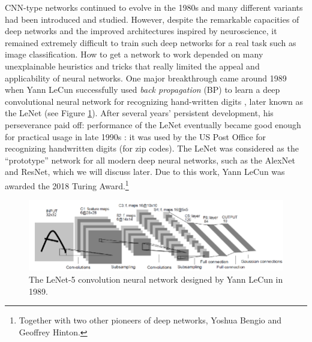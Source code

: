 \documentclass[../../book-main.tex]{subfiles}
\begin{document}
CNN-type networks continued to evolve in the 1980s and many different variants had been introduced and studied. However, despite the remarkable capacities of deep networks and the improved architectures inspired by neuroscience, it remained extremely difficult to train such deep networks for a real task such as image classification. How to get a network to work depended on many unexplainable heuristics and tricks that really limited the appeal and applicability of neural networks. One major breakthrough came around 1989 when Yann LeCun successfully used {\em back propagation} (BP) to learn a deep convolutional neural network for recognizing hand-written digits \cite{LeCun-1989}, later known as the LeNet (see Figure \ref{fig:LeNet-5}). After several years' persistent development, his perseverance paid off: performance of the LeNet eventually became good enough for practical usage in late 1990s \cite{LeCun-1998}: it was used by the US Post Office for recognizing handwritten digits (for zip codes).  The LeNet was considered as the ``prototype'' network for all modern deep neural networks, such as the AlexNet and ResNet, which we will discuss later. Due to this work, Yann LeCun was awarded the 2018 Turing Award.\footnote{Together with two other pioneers of deep networks, Yoshua Bengio and Geoffrey Hinton.}

\begin{figure}
    \centering
\includegraphics[width=0.95\linewidth]{figures/LeNet-5.png}
    \caption{The LeNet-5 convolution neural network designed by Yann LeCun in 1989. }
    \label{fig:LeNet-5}
\end{figure}
\end{document}
